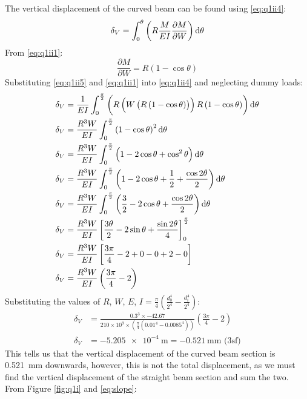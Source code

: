 \documentclass[11pt]{article}
\numberwithin{equation}{section}
\begin{document}
The vertical displacement of the curved beam can be found using \ref{eq:q1ii4}:
\begin{equation}
    \delta_V = \int_0^{\theta} \left(R\frac{M}{EI}\frac{\partial M}{\partial W}\right)\dif \theta \label{eq:q1ii4}
\end{equation}
From \ref{eq:q1ii1}:
\begin{equation}
    \frac{\partial M}{\partial W} = R\left(1-\cos\theta\right) \label{eq:q1ii5}
\end{equation}
Substituting \ref{eq:q1ii5} and \ref{eq:q1ii1} into \ref{eq:q1ii4} and neglecting dummy loads:
\begin{align}
    \delta_V &= \frac{1}{EI}\int_0^{\frac{\pi}{2}} \left(R\left(W\left(R\left(1-\cos\theta\right)\right)\right)R\left(1-\cos\theta\right)\right)\dif \theta\\
    \delta_V &= \frac{R^3W}{EI}\int_0^{\frac{\pi}{2}} \left(1-\cos\theta\right)^2\dif \theta\\
    \delta_V &= \frac{R^3W}{EI}\int_0^{\frac{\pi}{2}} \left(1-2\cos\theta + \cos^2\theta\right)\dif \theta\\
    \delta_V &= \frac{R^3W}{EI}\int_0^{\frac{\pi}{2}} \left(1-2\cos\theta + \frac{1}{2} + \frac{\cos 2\theta}{2}\right)\dif \theta\\
    \delta_V &= \frac{R^3W}{EI}\int_0^{\frac{\pi}{2}} \left(\frac{3}{2}-2\cos\theta + \frac{\cos 2\theta}{2}\right)\dif \theta\\
    \delta_V &= \frac{R^3W}{EI}\left[\frac{3\theta}{2}-2\sin\theta + \frac{\sin 2\theta}{4}\right]_0^{\frac{\pi}{2}}\\
    \delta_V &= \frac{R^3W}{EI}\left[\frac{3\pi}{4} -2 + 0 - 0 + 2 - 0\right]\\
    \delta_V &= \frac{R^3W}{EI}\left(\frac{3\pi}{4}-2\right)
\end{align}
Substituting the values of $R$, $W$, $E$, $I = \frac{\pi}{4}\left(\frac{d_0^4}{2^4}-\frac{d_i^4}{2^4}\right)$:
\begin{align}
    \delta_V &= \frac{0.3^3\times -42.67}{210\times 10^9 \times \left(\frac{\pi}{4}\left(0.01^4 - 0.0085^4\right)\right)}\left(\frac{3\pi}{4}-2\right)\\
    \delta_V &= \SI{-5.205e-4}{\meter} = \SI{-0.521}{\milli \meter} \textrm{ (3sf)}
\end{align}
This tells us that the vertical displacement of the curved beam section is \SI{0.521}{\milli \meter} downwards, however, this is not the total displacement, as we must find the vertical displacement of the straight beam section and sum the two. From Figure \ref{fig:q1i} and \ref{eq:slope}:
\end{document}
